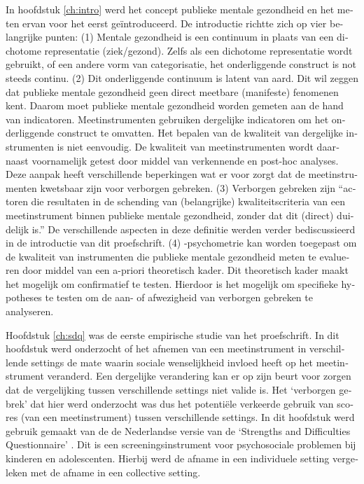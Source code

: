 \begin{otherlanguage}{dutch}
In hoofdstuk \ref{ch:intro} werd het concept publieke mentale gezondheid en het meten ervan voor het eerst ge\"introduceerd. De introductie richtte zich op vier belangrijke punten: (1) Mentale gezondheid is een continuum in plaats van een dichotome representatie (ziek/gezond). Zelfs als een dichotome representatie wordt gebruikt, of een andere vorm van categorisatie, het onderliggende construct is not steeds continu. (2) Dit onderliggende continuum is latent van aard. Dit wil zeggen dat publieke mentale gezondheid geen direct meetbare (manifeste) fenomenen kent. Daarom moet publieke mentale gezondheid worden gemeten aan de hand van indicatoren. Meetinstrumenten gebruiken dergelijke indicatoren om het onderliggende construct te omvatten. Het bepalen van de kwaliteit van dergelijke instrumenten is niet eenvoudig. De kwaliteit van meetinstrumenten wordt daarnaast voornamelijk getest door middel van verkennende en post-hoc analyses. Deze aanpak heeft verschillende beperkingen wat er voor zorgt dat de meetinstrumenten kwetsbaar zijn voor verborgen gebreken. (3) Verborgen gebreken zijn ``actoren die resultaten in de schending van (belangrijke) kwaliteitscriteria van een meetinstrument binnen publieke mentale gezondheid, zonder dat dit (direct) duidelijk is.'' De verschillende aspecten in deze definitie werden verder bediscussieerd in de introductie van dit proefschrift. (4) \textbeta-psychometrie kan worden toegepast om de kwaliteit van instrumenten die publieke mentale gezondheid meten te evalueren door middel van een a-priori theoretisch kader. Dit theoretisch kader maakt het mogelijk om confirmatief te testen. Hierdoor is het mogelijk om specifieke hypotheses te testen om de aan- of afwezigheid van verborgen gebreken te analyseren.

Hoofdstuk \ref{ch:sdq} was de eerste empirische studie van het proefschrift. In dit hoofdstuk werd onderzocht of het afnemen van een meetinstrument in verschillende settings de mate waarin sociale wenselijkheid invloed heeft op het meetinstrument veranderd. Een dergelijke verandering kan er op zijn beurt voor zorgen dat de vergelijking tussen verschillende settings niet valide is. Het `verborgen gebrek' dat hier werd onderzocht was dus het potenti\"ele verkeerde gebruik van scores (van een meetinstrument) tussen verschillende settings. In dit hoofdstuk werd gebruik gemaakt van de de Nederlandse versie van de `Strengths and Difficulties Questionnaire' \parencite[SDQ;][]{Goodman_1997}. Dit is een screeningsinstrument voor psychosociale problemen bij kinderen en adolescenten. Hierbij werd de afname in een individuele setting vergeleken met de afname in een collective setting.


\end{otherlanguage}
